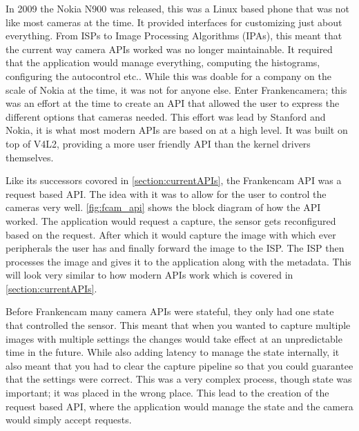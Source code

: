 In 2009 the Nokia N900 was released, this was a Linux based phone that was not
like most cameras at the time. It provided interfaces for customizing just
about everything. From ISPs to Image Processing Algorithms (IPAs), this meant
that the current way camera APIs worked was no longer maintainable. It
required that the application would manage everything, computing the
histograms, configuring the autocontrol etc.. While this was doable for a
company on the scale of Nokia at the time, it was not for anyone else. Enter
Frankencamera\cite{adams2010frankencamera}; this was an effort at the time
to create an API that allowed the user to express the different options that
cameras needed. This effort was lead by Stanford and Nokia, it is what most
modern APIs are based on at a high level. It was built on top of V4L2,
providing a more user friendly API than the kernel drivers themselves.

Like its successors covored in \cref{section:currentAPIs}, the Frankencam API
was a request based API. The idea with it was to allow for the user to control
the cameras very well. \cref{fig:fcam_api} shows the block diagram of how the
API worked. The application would request a capture, the sensor gets
reconfigured based on the request. After which it would capture the image with
which ever peripherals the user has and finally forward the image to the ISP.
The ISP then processes the image and gives it to the application along with the
metadata. This will look very similar to how modern APIs work which is covered
in \cref{section:currentAPIs}.

Before Frankencam many camera APIs were stateful\cite{experimentalCompPhot},
they only had one state that controlled the sensor. This meant that when you
wanted to capture multiple images with multiple settings the changes would take
effect at an unpredictable time in the future. While also adding latency to
manage the state internally, it also meant that you had to clear the capture
pipeline so that you could guarantee that the settings were correct. This was a
very complex process, though state was important; it was placed in the wrong
place. This lead to the creation of the request based API, where the
application would manage the state and the camera would simply accept requests.

